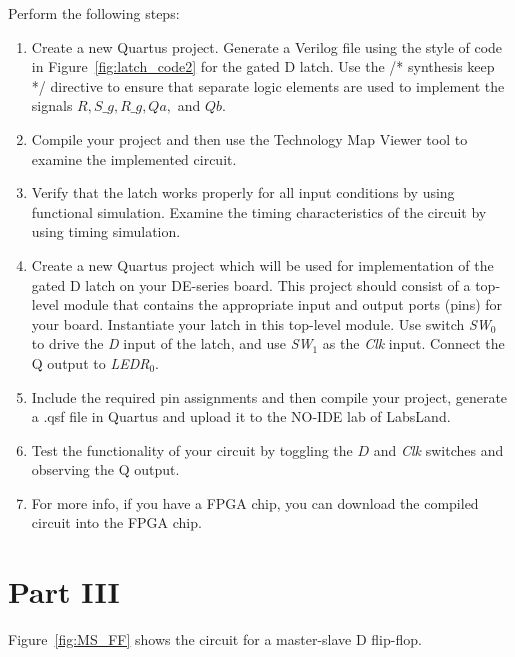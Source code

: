 \documentclass[epsfig,10pt,fullpage]{article}
\begin{document}
Perform the following steps:
\begin{enumerate}
\item Create a new Quartus project. Generate a Verilog file using the style of code 
in Figure~\ref{fig:latch_code2} for the gated D latch. 
Use the /* synthesis keep */ directive to ensure
that separate logic elements are used to implement the signals $R, S\_g, R\_g, Qa,$ and $Qb$.
\item Compile your project and then use the 
Technology Map Viewer tool to examine the implemented circuit.
\item Verify that the latch works properly for all input conditions by using functional 
simulation. Examine the timing characteristics of the circuit by using timing simulation.
\item Create a new Quartus project which will be used for implementation of the gated D
latch on your DE-series board. This project should consist of a top-level module that 
contains the appropriate input and output ports (pins) for your board. Instantiate your
latch in this top-level module. Use switch {\it SW}$_0$ to drive the {\it D} input of the latch,
and use {\it SW}$_1$ as the {\it Clk} input. Connect the Q output to {\it LEDR}$_{0}$.
\item
Include the required pin assignments and then compile your project, generate a .qsf file in Quartus and upload it to the NO-IDE lab of LabsLand.
\item
Test the functionality of your circuit by toggling the $D$ and {\it Clk} switches and observing 
the Q output.
\item For more info, if you have a FPGA chip, you can download the compiled circuit into the FPGA chip.
\end{enumerate}

\section*{Part III}
Figure~\ref{fig:MS_FF} shows the circuit for a master-slave D flip-flop.
\end{document}
